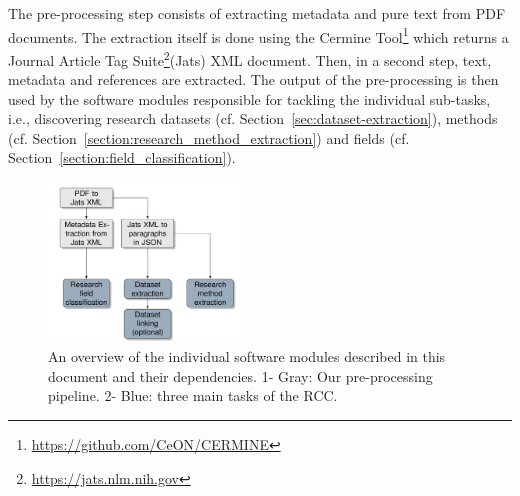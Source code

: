 The pre-processing step consists of extracting metadata and pure text from PDF documents. The extraction itself is done using the Cermine Tool\footnote{\url{https://github.com/CeON/CERMINE}} which returns a Journal Article Tag Suite\footnote{\url{https://jats.nlm.nih.gov}}(Jats) XML document. Then, in a second step,
text, metadata and references are extracted. The output of the pre-processing is then used by the software modules responsible for tackling the individual sub-tasks, i.e., discovering research datasets (cf. Section~\ref{sec:dataset-extraction}), methods (cf. Section~\ref{section:research_method_extraction}) and fields (cf. Section~\ref{section:field_classification}).






\begin{figure}[t]
    \includegraphics[width=0.47\textwidth]{figures/information-flow.png}
    \caption{An overview of the individual software modules described in this document and their dependencies. 1- Gray: Our pre-processing pipeline. 2- Blue: three main tasks of the RCC.}
    \label{figure:pipeline}
\end{figure}


